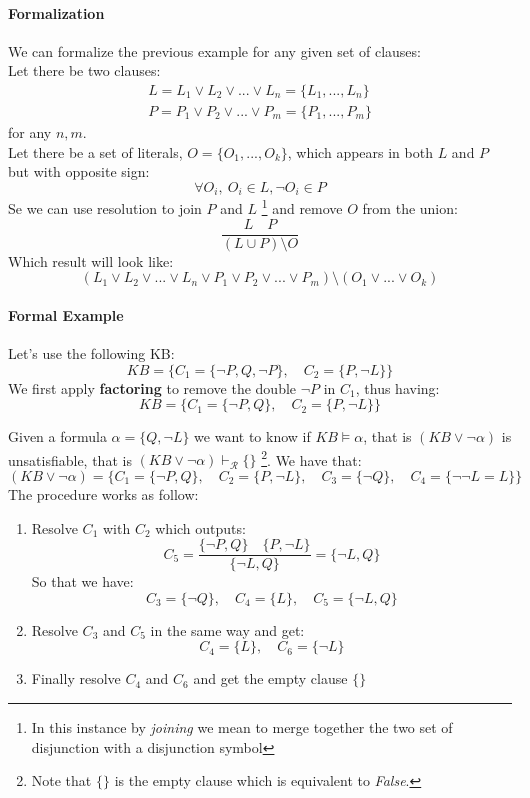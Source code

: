 \documentclass[10pt,a4paper]{article}
\begin{document}
\paragraph{Formalization}
We can formalize the previous example for any given set of clauses:\\
Let there be two clauses:
\begin{align}
L=L_1\vee L_2 \vee...\vee L_n=\lbrace L_1,...,L_n\rbrace\\ 
P=P_1\vee P_2 \vee...\vee P_m=\lbrace P_1,...,P_m\rbrace
\end{align}
for any $n,m$.\\
Let there be a set of literals, $O=\lbrace O_1,...,O_k\rbrace$, which appears in both $L$ and $P$ but with opposite sign:
\[\forall O_i,\ O_i \in L, \neg O_i \in P\]
Se we can use resolution to join $P$ and $L$ \footnote{In this instance by \textit{joining} we mean to merge together the two set of disjunction with a disjunction symbol} and remove $O$ from the union:
\[\frac{L\quad P}{(L\cup P)\setminus O}\]
Which result will look like:
\[(L_1\vee L_2 \vee...\vee L_n\vee P_1\vee P_2 \vee...\vee P_m)\setminus (O_1\vee...\vee O_k)  \]

\paragraph{Formal Example}
Let's use the following KB:
\[KB=\lbrace C_1=\lbrace\neg P,Q,\neg P\rbrace,\quad C_2=\lbrace P,\neg L\rbrace \rbrace\]
We first apply \textbf{factoring} to remove the double $\neg P$ in $C_1$, thus having:
\[KB=\lbrace C_1=\lbrace\neg P,Q\rbrace,\quad C_2=\lbrace P,\neg L\rbrace \rbrace\]

Given a formula $\alpha=\lbrace Q,\neg L\rbrace$ we want to know if $KB \models \alpha$, that is $(KB \vee \neg \alpha)$ is unsatisfiable, that is  $(KB \vee \neg \alpha) \vdash_{\mathcal{R}} \{\}$ \footnote{Note that $\{\}$ is the empty clause which is equivalent to \textit{False}.}. We have that:
\[(KB \vee \neg \alpha)=\lbrace C_1=\lbrace\neg P,Q\rbrace,\quad C_2=\lbrace P,\neg L\rbrace,\quad C_3=\lbrace \neg Q \rbrace,\quad C_4=\lbrace \neg \neg L=L\rbrace \rbrace\]
The procedure works as follow:
\begin{enumerate}
\item Resolve $C_1$ with $C_2$ which outputs:
\[C_5=\frac{\lbrace\neg P,Q\rbrace\quad \lbrace P,\neg L\rbrace}{\lbrace\neg L,Q\rbrace}=\lbrace\neg L,Q\rbrace\]
So that we have:
\[ C_3=\lbrace \neg Q \rbrace,\quad C_4=\lbrace L\rbrace ,\quad C_5=\lbrace\neg L,Q\rbrace \]
\item Resolve $C_3$ and $C_5$ in the same way and get:
\[C_4=\lbrace L\rbrace ,\quad C_6=\lbrace\neg L\rbrace \]
\item Finally resolve $C_4$ and $C_6$ and get the empty clause $\{\}$
\end{enumerate}
\end{document}
